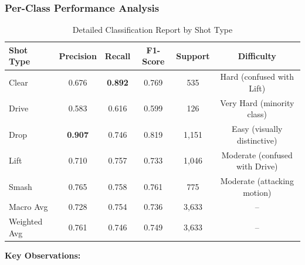 \documentclass[11pt,a4paper]{article}
\begin{document}
\subsubsection{Per-Class Performance Analysis}

\begin{table}[H]
\centering
\caption{Detailed Classification Report by Shot Type}
\begin{tabular}{lccccc}
\toprule
Shot Type & Precision & Recall & F1-Score & Support & Difficulty \\
\midrule
Clear & 0.676 & \textbf{0.892} & 0.769 & 535 & Hard (confused with Lift) \\
Drive & 0.583 & 0.616 & 0.599 & 126 & Very Hard (minority class) \\
Drop & \textbf{0.907} & 0.746 & 0.819 & 1,151 & Easy (visually distinctive) \\
Lift & 0.710 & 0.757 & 0.733 & 1,046 & Moderate (confused with Drive) \\
Smash & 0.765 & 0.758 & 0.761 & 775 & Moderate (attacking motion) \\
\midrule
Macro Avg & 0.728 & 0.754 & 0.736 & 3,633 & -- \\
Weighted Avg & 0.761 & 0.746 & 0.749 & 3,633 & -- \\
\bottomrule
\end{tabular}
\end{table}

\textbf{Key Observations:}
\end{document}
